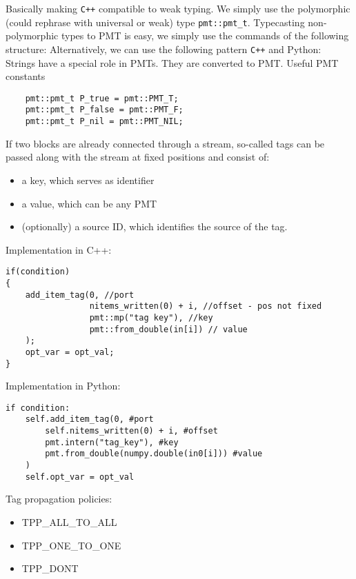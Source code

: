 \documentclass{article}
\begin{document}
\begin{description}[leftmargin=!, labelwidth=1in]
	\item[PMTs]  Basically making \texttt{C++} compatible to weak typing. We simply use the polymorphic (could rephrase with universal or weak) type \texttt{pmt::pmt\_t}. Typecasting non-polymorphic types to PMT is easy, we simply use the commands of the following structure:
	Alternatively, we can use the following pattern \texttt{C++} and Python:
	Strings have a special role in PMTs. They are converted to PMT.
	Useful PMT constants
	\begin{verbatim}
	pmt::pmt_t P_true = pmt::PMT_T;
	pmt::pmt_t P_false = pmt::PMT_F;
	pmt::pmt_t P_nil = pmt::PMT_NIL;
	\end{verbatim}
	\item[Stream Tags] If two blocks are already connected through a stream, so-called tags can be passed along with the stream at fixed positions and consist of:
	\begin{itemize}
		\item a key, which serves as identifier
		\item a value, which can be any PMT
		\item (optionally) a source ID, which identifies the source of the tag.
	\end{itemize}
	Implementation in C++:
	\begin{verbatim}
if(condition)
{
	add_item_tag(0, //port
				 nitems_written(0) + i, //offset - pos not fixed
				 pmt::mp("tag key"), //key
				 pmt::from_double(in[i]) // value
	);
	opt_var = opt_val;
}
	\end{verbatim}
	Implementation in Python:
	\begin{verbatim}
if condition:
	self.add_item_tag(0, #port
		self.nitems_written(0) + i, #offset
		pmt.intern("tag_key"), #key
		pmt.from_double(numpy.double(in0[i])) #value
	)
	self.opt_var = opt_val
	\end{verbatim}
	Tag propagation policies:
	\begin{itemize}
		\item TPP\_ALL\_TO\_ALL
		\item TPP\_ONE\_TO\_ONE
		\item TPP\_DONT
	\end{itemize}
	

\end{description}
\end{document}
